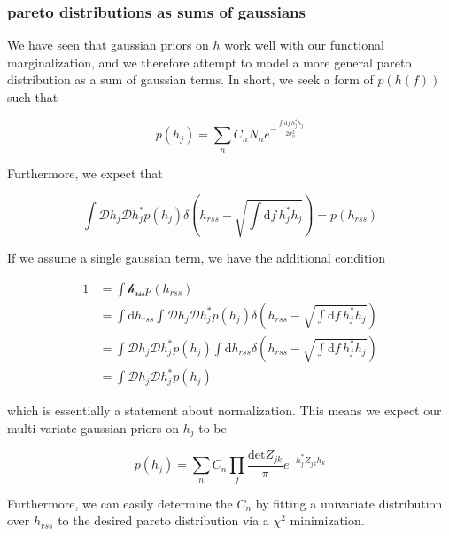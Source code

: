 \documentclass[10pt]{article}
\begin{document}
\subsubsection{pareto distributions as sums of gaussians}

We have seen that gaussian priors on $h$ work well with our functional marginalization, and we therefore attempt to model a more general pareto distribution as a sum of gaussian terms. In short, we seek a form of $p(h(f))$ such that

\begin{equation}
p(h_j) = \sum\limits_{n} C_n N_n e^{-\frac{\int \mathrm{d}f\, h_j^\ast h_j}{2 \sigma_n^2} }
\end{equation}

Furthermore, we expect that 

\begin{equation}\label{equation:h to hrss identity}
\int \mathcal{D} h_j \mathcal{D} h_j^\ast p(h_j) \delta\left( h_{rss}- \sqrt{ \int \mathrm{d}f\, h_j^\ast h_j }\right) = p(h_{rss}) 
\end{equation}

If we assume a single gaussian term, we have the additional condition

\begin{subequations}
\begin{align}
1 & = \int\mathcal{h_{rss}}p(h_{rss}) \\
  & = \int\mathrm{d}h_{rss} \int\mathcal{D}h_j\mathcal{D}h_j^\ast p(h_j) \delta\left(h_{rss}-\sqrt{ \int \mathrm{d}f\, h_j^\ast h_j }\right) \\
  & = \int\mathcal{D}h_j\mathcal{D}h_j^\ast p(h_j) \int\mathrm{d}h_{rss} \delta\left(h_{rss}-\sqrt{ \int \mathrm{d}f\, h_j^\ast h_j }\right) \\
  & = \int\mathcal{D}h_j\mathcal{D}h_j^\ast p(h_j)
\end{align}
\end{subequations}

which is essentially a statement about normalization. This means we expect our multi-variate gaussian priors on $h_j$ to be

\begin{equation}
p(h_j) = \sum\limits_{n} C_n \prod\limits_{f} \frac{\mathrm{det}Z_{jk}}{\pi} e^{- h_j^\ast Z_{jk} h_k }
\end{equation}

Furthermore, we can easily determine the $C_n$ by fitting a univariate distribution over $h_{rss}$ to the desired pareto distribution via a $\chi^2$ minimization.
\end{document}
